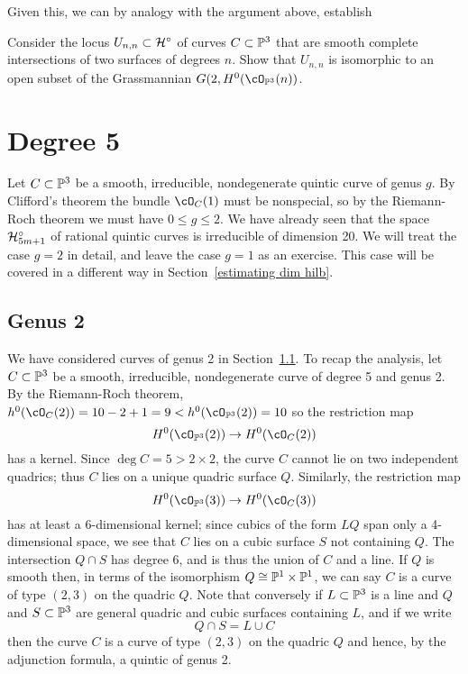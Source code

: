 Given this, we can by analogy with the argument above, establish

\begin{exercise}\label{first complete intersection exercise}
Consider  the locus $U_{n,n} \subset \cH^\circ$ of curves $C \subset \PP^3$ that are smooth complete intersections of two surfaces of degrees $n$. Show that $U_{n,n}$ 
is isomorphic to an open subset of the Grassmannian $G(2, H^0(\cO_{\PP^3}(n))$.
\end{exercise}

%
%

\section{Degree 5}

Let $C \subset \PP^3$ be a smooth, irreducible, nondegenerate quintic curve of genus $g$. By Clifford's theorem the bundle $\cO_C(1)$ must be nonspecial, so  by the Riemann-Roch theorem we must have $0\leq g \leq 2$. We have already seen that the space $\cH^\circ_{5m+1}$ of rational quintic curves is irreducible of dimension 20. We will treat the case $g=2$ in detail, and leave the case $g=1$ as an exercise. This case will be covered in a different way in Section~\ref{estimating dim hilb}.

\subsection{Genus 2}

We have considered curves of genus 2 in Section~\ref{}.  To recap the analysis, let $C \subset \PP^3$ be a smooth, irreducible, nondegenerate curve of degree 5 and genus 2. By the Riemann-Roch theorem,  $h^0(\cO_C(2)) = 10-2+1 = 9<h^0(\cO_{\PP^3}(2)) = 10$  so the restriction map
$$
H^0(\cO_{\PP^3}(2)) \to H^0(\cO_C(2))
$$
has a kernel. Since $\deg C = 5 > 2\times 2$, the curve $C$ cannot lie on two independent quadrics; thus $C$ lies on a unique quadric surface $Q$. Similarly, the restriction map
$$
H^0(\cO_{\PP^3}(3)) \to H^0(\cO_C(3))
$$
has at least a 6-dimensional kernel; since cubics of the form $LQ$ span only a 4-dimensional space, we see that $C$ lies on a cubic surface $S$ not containing $Q$. The intersection $Q\cap S$
has degree 6, and is thus the union of $C$ and a line. If $Q$ is smooth then, in terms of the isomorphism $Q \cong \PP^1 \times \PP^1$, we can say $C$ is a curve of type $(2,3)$ on the quadric $Q$. Note that conversely if $L \subset \PP^3$ is a line and $Q$ and $S \subset \PP^3$ are general quadric and cubic surfaces containing $L$, and if we write
$$
Q \cap S = L \cup C
$$ 
then the curve $C$ is a curve of type $(2,3)$ on the quadric $Q$ and hence, by the adjunction formula,
 a quintic of genus 2.

